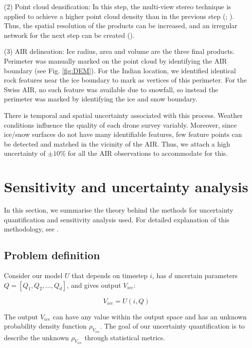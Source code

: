 (2) Point cloud densification: In this step, the multi-view stereo technique is applied to achieve a higher
point cloud density than in the previous step (\cite{furukawaAccurateDenseRobust2010};
\cite{molgStructurefromMotionUsingHistorical2017}). Thus, the spatial resolution of the products can be
increased, and an irregular network for the next step can be created (\cite{kungACCURACYAUTOMATICPHOTOGRAMMETRIC2011}).

(3) AIR delineation: Ice radius, area and volume are the three final products. Perimeter was manually marked
on the point cloud by identifying the AIR boundary (see Fig. \ref{fig:DEM}). For the Indian location, we identified identical rock features
near the ice boundary to mark as vertices of this perimeter. For the Swiss AIR, no such feature was available due
to snowfall, so instead the perimeter was marked by identifying the ice and snow boundary.

There is temporal and spatial uncertainty associated with this process. Weather conditions influence the quality
of each drone survey variably. Moreover, since ice/snow surfaces do not have many identifiable features, few
feature points can be detected and matched in the vicinity of the AIR. Thus, we attach a high uncertainty of
$\pm 10 \%$ for all the AIR observations to accommodate for this.

\section{Sensitivity and uncertainty analysis} \label{sec:uncertainpy}

In this section, we summarise the theory behind the methods for uncertainty quantification and sensitivity
analysis used. For detailed explanation of this methodology, see \cite{tennoeUncertainpyPythonToolbox2018}.

\subsection{Problem definition}
Consider our model $U$ that depends on timestep $i$, has $d$ uncertain parameters $Q = [Q_1, Q_2, \dots, Q_d]$, and
gives output $V_{ice}$:

\begin{equation}
V_{ice} = U(i,Q)
\end{equation}

The output $V_{ice}$ can have any value within the output space and has an unknown probability density function
$\rho_{V_{ice}}$. The goal of our uncertainty quantification is to describe the unknown $\rho_{V_{ice}}$ through
statistical metrics.

